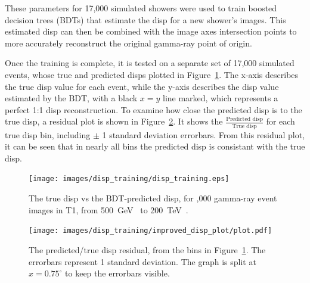 These parameters for 17,000 simulated showers were used to train boosted decision trees (BDTs) that estimate the disp for a new shower's images.
This estimated disp can then be combined with the image axes intersection points to more accurately reconstruct the original gamma-ray point of origin.

Once the training is complete, it is tested on a separate set of 17,000 simulated events, whose true and predicted disps plotted in Figure~\ref{fig:disptraining}.
The x-axis describes the true disp value for each event, while the y-axis describes the disp value estimated by the BDT, with a black $x=y$ line marked, which represents a perfect 1:1 disp reconstruction.
To examine how close the predicted disp is to the true disp, a residual plot is shown in Figure~\ref{fig:dispresidual}.
It shows the $\frac{\textrm{Predicted disp}}{\textrm{True disp}}$ for each true disp bin, including $\pm$ 1 standard deviation errorbars.
From this residual plot, it can be seen that in nearly all bins the predicted disp is consistant with the true disp.

\begin{figure}[b]
  \centering
  \texttt{[image: images/disp\_training/disp\_training.eps]}
  \caption[Disp BDT Training]{
    The true disp vs the BDT-predicted disp, for ,000 gamma-ray event images in T1, from \SI{500}{\GeV{}} to \SI{200}{\TeV{}}.
  }
  \label{fig:disptraining}
\end{figure}

\begin{figure}[t]
  \centering
  \texttt{[image: images/disp\_training/improved\_disp\_plot/plot.pdf]}
  \caption[Disp BDT Residual]{
    The predicted/true disp residual, from the bins in Figure~\ref{fig:disptraining}.
    The errorbars represent 1 standard deviation.
    The graph is split at $x=0.75^{\circ}$ to keep the errorbars visible.
  }
  \label{fig:dispresidual}
\end{figure}

